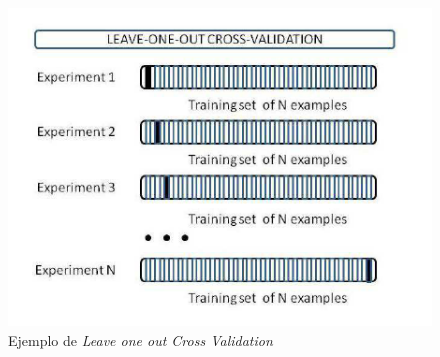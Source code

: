 \begin{figure}[H]
	\centering
	\caption{Ejemplo de  \textit{Leave one out Cross Validation} \cite{LOO}}
	\includegraphics[width=\textwidth]{./imagenes/LOO.png}
\end{figure}
